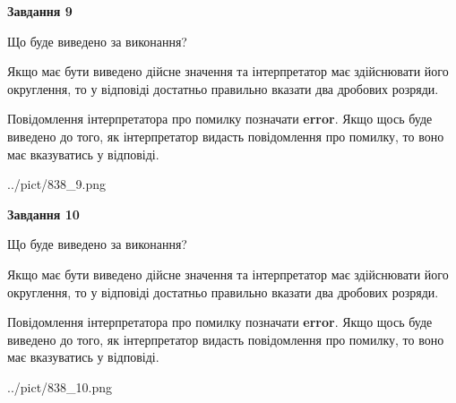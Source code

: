 \documentclass[12pt, ukrainian]{article}
\begin{document}
{\begin {Large}
{\begin {center}\textbf{Завдання 9}\end {center}}\par
Що буде виведено за виконання? \par

Якщо має бути виведено дійсне значення та інтерпретатор має здійснювати його округлення, 
то у відповіді достатньо правильно вказати два дробових розряди.

Повідомлення інтерпретатора про помилку позначати \textbf{error}.
Якщо щось буде виведено до того, як інтерпретатор видасть повідомлення про помилку, 
то воно має вказуватись у відповіді. \par

\begin{center}
	{../pict/838_9.png}
\end{center}
\newpage

{\begin {center}\textbf{Завдання 10}\end {center}}\par
Що буде виведено за виконання? \par

Якщо має бути виведено дійсне значення та інтерпретатор має здійснювати його округлення, 
то у відповіді достатньо правильно вказати два дробових розряди.

Повідомлення інтерпретатора про помилку позначати \textbf{error}.
Якщо щось буде виведено до того, як інтерпретатор видасть повідомлення про помилку, 
то воно має вказуватись у відповіді. \par

\begin{center}
	{../pict/838_10.png}
\end{center}
\newpage

\end {Large}}
\end{document}
